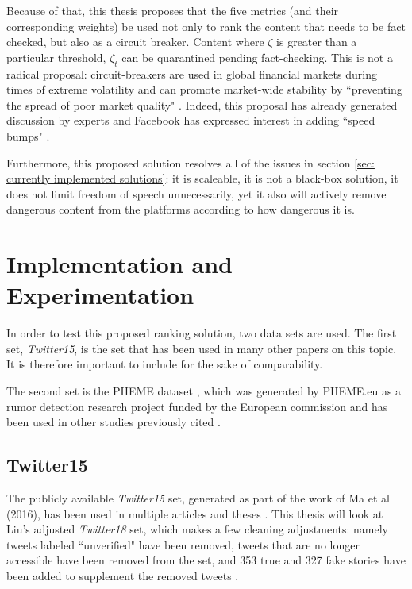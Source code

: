 \documentclass[preprint,review,12pt]{elsarticle}
\begin{document}
Because of that, this thesis proposes that the five metrics (and their corresponding weights) be used not only to rank the content that needs to be fact checked, but also as a circuit breaker. Content where $\zeta$ is greater than a particular threshold, $\zeta_t$ can be quarantined pending fact-checking. This is not a radical proposal: circuit-breakers are used in global financial markets during times of extreme volatility \cite{wang2019microstructure,schwert1990stock} and can promote market-wide stability by ``preventing the spread of poor market quality" \cite{brugler2014single,schneider2020stock}. Indeed, this proposal has already generated discussion by experts \cite{goodman2020digital,simpson2020fighting} and Facebook has expressed interest in adding ``speed bumps" \cite{bond2020circuit}.

Furthermore, this proposed solution resolves all of the issues in section \ref{sec: currently implemented solutions}: it is scaleable, it is not a black-box solution, it does not limit freedom of speech unnecessarily, yet it also will actively remove dangerous content from the platforms according to how dangerous it is.

\section{Implementation and Experimentation}
In order to test this proposed ranking solution, two data sets are used. The first set, \textit{Twitter15}, is the set that has been used in many other papers on this topic. It is therefore important to include for the sake of comparability.

The second set is the PHEME dataset \cite{kochkina2018pheme}, which was generated by PHEME.eu as a rumor detection research project funded by the European commission and has been used in other studies previously cited \cite{zubiaga2016analysing}. 


\subsection{Twitter15}
 The publicly available \textit{Twitter15} set, generated as part of the work of Ma et al (2016), has been used in multiple articles and theses \citep{liu2018early,ma2017detect,ma2016detecting,khoo2020interpretable,liu2019early,huang2019deep}. This thesis will look at Liu's adjusted \textit{Twitter18} set, which makes a few cleaning adjustments: namely tweets labeled ``unverified" have been removed, tweets that are no longer accessible have been removed from the set, and 353 true and 327 fake stories have been added to supplement the removed tweets \citep{liu2019early}. 
 
\end{document}

